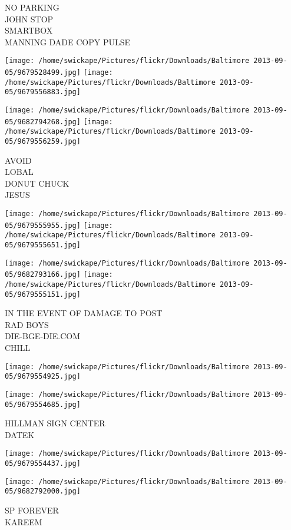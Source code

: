 \documentclass[10pt,letterpaper]{article}
\begin{document}
NO PARKING\\
JOHN STOP\\
SMARTBOX\\
MANNING DADE COPY PULSE
\pagebreak

\texttt{[image: /home/swickape/Pictures/flickr/Downloads/Baltimore 2013-09-05/9679528499.jpg]}
\texttt{[image: /home/swickape/Pictures/flickr/Downloads/Baltimore 2013-09-05/9679556883.jpg]}

\texttt{[image: /home/swickape/Pictures/flickr/Downloads/Baltimore 2013-09-05/9682794268.jpg]}
\texttt{[image: /home/swickape/Pictures/flickr/Downloads/Baltimore 2013-09-05/9679556259.jpg]}

AVOID\\
LOBAL\\
DONUT CHUCK\\
JESUS
\pagebreak

\texttt{[image: /home/swickape/Pictures/flickr/Downloads/Baltimore 2013-09-05/9679555955.jpg]}
\texttt{[image: /home/swickape/Pictures/flickr/Downloads/Baltimore 2013-09-05/9679555651.jpg]}

\texttt{[image: /home/swickape/Pictures/flickr/Downloads/Baltimore 2013-09-05/9682793166.jpg]}
\texttt{[image: /home/swickape/Pictures/flickr/Downloads/Baltimore 2013-09-05/9679555151.jpg]}

IN THE EVENT OF DAMAGE TO POST\\
RAD BOYS\\
DIE{-}BGE{-}DIE.COM\\
CHILL
\pagebreak

\texttt{[image: /home/swickape/Pictures/flickr/Downloads/Baltimore 2013-09-05/9679554925.jpg]}

\vspace{0.25in}
\texttt{[image: /home/swickape/Pictures/flickr/Downloads/Baltimore 2013-09-05/9679554685.jpg]}

HILLMAN SIGN CENTER\\
DATEK
\pagebreak

\texttt{[image: /home/swickape/Pictures/flickr/Downloads/Baltimore 2013-09-05/9679554437.jpg]}

\vspace{0.25in}
\texttt{[image: /home/swickape/Pictures/flickr/Downloads/Baltimore 2013-09-05/9682792000.jpg]}

SP FOREVER\\
KAREEM
\pagebreak
\end{document}

